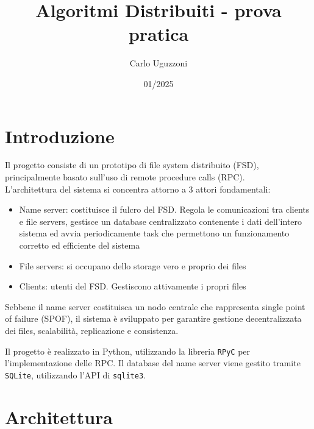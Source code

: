 \documentclass[a4paper, 12pt]{scrreprt}
\begin{document}
    \title{Algoritmi Distribuiti - prova pratica}
    \date{01/2025}
    \author{Carlo Uguzzoni}

    \maketitle

    \tableofcontents
    \thispagestyle{empty}

    \newpage
    \setcounter{page}{1}

    \chapter{Introduzione}

        Il progetto consiste di un prototipo di file system distribuito (FSD), principalmente basato sull'uso di remote procedure calls (RPC).\\
        L'architettura del sistema si concentra attorno a 3 attori fondamentali:

        \begin{itemize}

            \item Name server: costituisce il fulcro del FSD. Regola le comunicazioni tra clients e file servers, gestisce un database centralizzato contenente i dati dell'intero sistema ed avvia periodicamente task che permettono un funzionamento corretto ed efficiente del sistema

            \item File servers: si occupano dello storage vero e proprio dei files

            \item Clients: utenti del FSD. Gestiscono attivamente i propri files

        \end{itemize}

        Sebbene il name server costituisca un nodo centrale che rappresenta single point of failure (SPOF), il sistema è sviluppato per garantire gestione decentralizzata dei files, scalabilità, replicazione e consistenza.


        Il progetto è realizzato in Python, utilizzando la libreria \texttt{RPyC} per l'implementazione delle RPC. Il database del name server viene gestito tramite \texttt{SQLite}, utilizzando l'API di \texttt{sqlite3}.

    \chapter{Architettura}
\end{document}

